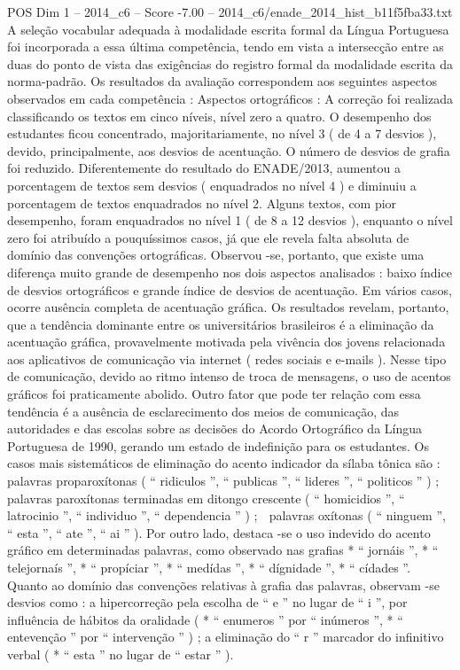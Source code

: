 \begin{textsample}{POS Dim 1 – 2014\_c6 – Score -7.00 – 2014\_c6/enade\_2014\_hist\_b11f5fba33.txt}
A seleção vocabular adequada à modalidade escrita formal da Língua Portuguesa foi incorporada a essa última competência, tendo em vista a intersecção entre as duas do ponto de vista das exigências do registro formal da modalidade escrita da norma-padrão.
Os resultados da avaliação correspondem aos seguintes aspectos observados em cada competência : Aspectos ortográficos : A correção foi realizada classificando os textos em cinco níveis, nível zero a quatro.
O desempenho dos estudantes ficou concentrado, majoritariamente, no nível 3 ( de 4 a 7 desvios ), devido, principalmente, aos desvios de acentuação.
O número de desvios de grafia foi reduzido.
Diferentemente do resultado do ENADE/2013, aumentou a porcentagem de textos sem desvios ( enquadrados no nível 4 ) e diminuiu a porcentagem de textos enquadrados no nível 2.
Alguns textos, com pior desempenho, foram enquadrados no nível 1 ( de 8 a 12 desvios ), enquanto o nível zero foi atribuído a pouquíssimos casos, já que ele revela falta absoluta de domínio das convenções ortográficas.
Observou -se, portanto, que existe uma diferença muito grande de desempenho nos dois aspectos analisados : baixo índice de desvios ortográficos e grande índice de desvios de acentuação.
Em vários casos, ocorre ausência completa de acentuação gráfica.
Os resultados revelam, portanto, que a tendência dominante entre os universitários brasileiros é a eliminação da acentuação gráfica, provavelmente motivada pela vivência dos jovens relacionada aos aplicativos de comunicação via internet ( redes sociais e e-mails ).
Nesse tipo de comunicação, devido ao ritmo intenso de troca de mensagens, o uso de acentos gráficos foi praticamente abolido.
Outro fator que pode ter relação com essa tendência é a ausência de esclarecimento dos meios de comunicação, das autoridades e das escolas sobre as decisões do Acordo Ortográfico da Língua Portuguesa de 1990, gerando um estado de indefinição para os estudantes.
Os casos mais sistemáticos de eliminação do acento indicador da sílaba tônica são :  palavras proparoxítonas ( “ ridiculos ”, “ publicas ”, “ lideres ”, “ politicos ” ) ;  palavras paroxítonas terminadas em ditongo crescente ( “ homicidios ”, “ latrocinio ”, “ individuo ”, “ dependencia ” ) ;  palavras oxítonas ( “ ninguem ”, “ esta ”, “ ate ”, “ ai ” ).
Por outro lado, destaca -se o uso indevido do acento gráfico em determinadas palavras, como observado nas grafias * “ jornáis ”, * “ telejornaís ”, * “ propíciar ”, * “ medídas ”, * “ dígnidade ”, * “ cídades ”.
Quanto ao domínio das convenções relativas à grafia das palavras, observam -se desvios como : a hipercorreção pela escolha de “ e ” no lugar de “ i ”, por influência de hábitos da oralidade ( * “ enumeros ” por “ inúmeros ”, * “ entevenção ” por “ intervenção ” ) ; a eliminação do “ r ” marcador do infinitivo verbal ( * “ esta ” no lugar de “ estar ” ).

\end{textsample}
